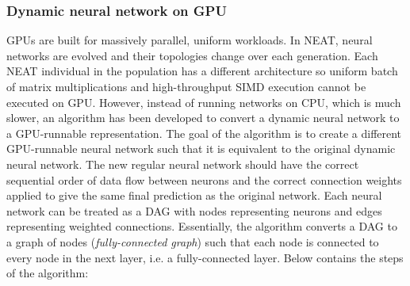 \subsubsection{Dynamic neural network on GPU}
\label{subsubsec:dynamic_nn_on_gpu}
GPUs are built for massively parallel, uniform workloads. In NEAT, neural networks are evolved and their topologies change over each generation. Each NEAT individual in the population has a different architecture so uniform batch of matrix multiplications and high-throughput SIMD execution cannot be executed on GPU. However, instead of running networks on CPU, which is much slower, an algorithm has been developed to convert a dynamic neural network to a GPU-runnable representation. The goal of the algorithm is to create a different GPU-runnable neural network such that it is equivalent to the original dynamic neural network. The new regular neural network should have the correct sequential order of data flow between neurons and the correct connection weights applied to give the same final prediction as the original network. Each neural network can be treated as a DAG with nodes representing neurons and edges representing weighted connections. Essentially, the algorithm converts a DAG to a graph of nodes (\textit{fully-connected graph}) such that each node is connected to every node in the next layer, i.e. a fully-connected layer. Below contains the steps of the algorithm: 
